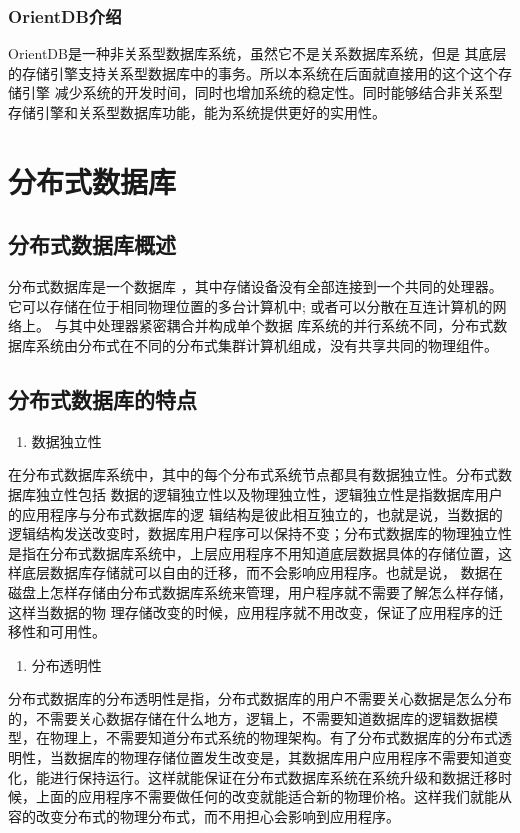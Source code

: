 \subsubsection{OrientDB介绍}
OrientDB是一种非关系型数据库系统，虽然它不是关系数据库系统，但是
其底层的存储引擎支持关系型数据库中的事务。所以本系统在后面就直接用的这个这个存储引擎
减少系统的开发时间，同时也增加系统的稳定性。同时能够结合非关系型存储引擎和关系型数据库功能，能为系统提供更好的实用性。
\section{分布式数据库}
\subsection{分布式数据库概述}
分布式数据库是一个数据库
，其中存储设备没有全部连接到一个共同的处理器。
它可以存储在位于相同物理位置的多台计算机中; 
或者可以分散在互连计算机的网络上。
与其中处理器紧密耦合并构成单个数据
库系统的并行系统不同，分布式数据库系统由分布式在不同的分布式集群计算机组成，没有共享共同的物理组件。
\subsection{分布式数据库的特点}

	\begin{enumerate}
		\item 数据独立性
	\end{enumerate}

	在分布式数据库系统中，其中的每个分布式系统节点都具有数据独立性。分布式数据库独立性包括
	数据的逻辑独立性以及物理独立性，逻辑独立性是指数据库用户的应用程序与分布式数据库的逻
	辑结构是彼此相互独立的，也就是说，当数据的逻辑结构发送改变时，数据库用户程序可以保持不变；分布式数据库的物理独立性是指在分布式数据库系统中，上层应用程序不用知道底层数据具体的存储位置，这样底层数据库存储就可以自由的迁移，而不会影响应用程序。也就是说，
	数据在磁盘上怎样存储由分布式数据库系统来管理，用户程序就不需要了解怎么样存储，这样当数据的物
	理存储改变的时候，应用程序就不用改变，保证了应用程序的迁移性和可用性。
	

	\begin{enumerate}[resume]
		\item 分布透明性
	\end{enumerate}

	分布式数据库的分布透明性是指，分布式数据库的用户不需要关心数据是怎么分布的，不需要关心数据存储在什么地方，逻辑上，不需要知道数据库的逻辑数据模型，在物理上，不需要知道分布式系统的物理架构。有了分布式数据库的分布式透明性，当数据库的物理存储位置发生改变是，其数据库用户应用程序不需要知道变化，能进行保持运行。这样就能保证在分布式数据库系统在系统升级和数据迁移时候，上面的应用程序不需要做任何的改变就能适合新的物理价格。这样我们就能从容的改变分布式的物理分布式，而不用担心会影响到应用程序。

